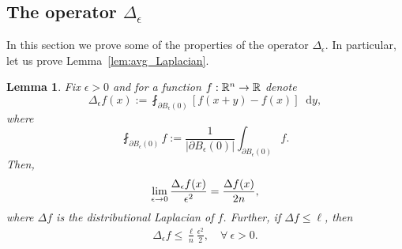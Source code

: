 \documentclass[10pt]{amsart}
\newtheorem{lemm}[theo]{Lemma}\newtheorem{prop}[theo]{Proposition}\newtheorem{coro}[theo]{Corollary}\newtheorem{conj}[theo]{Conjecture}
\theoremstyle{definition}\newtheorem{defi}[theo]{Definition}\newtheorem{rema}[theo]{Remark}\newtheorem{exam}[theo]{Example}\newtheorem{exem}[theo]{Example}\newtheorem{nota}[theo]{Notation}
\newcommand{\R}{\mathbb R}
\newcommand{\dd}{n}
\newcommand*\diff{\mathop{}\!\mathrm{d}}
\newcommand{\avgint}{\fint}
\renewcommand*{\to}{\mathchoice{\longrightarrow}{\rightarrow}{\rightarrow}{\rightarrow}}
\let\oldforall\forall
\renewcommand*{\forall}{\mathrel{\oldforall}}
\begin{document}
\subsection{The operator \texorpdfstring{$\Delta_{\epsilon}$}{Delta\_ epsilon}}\label{subsec:appendix_Delta_eps}
In this section we prove some of the properties of the operator $\Delta_{\epsilon}$. In particular, let us prove Lemma~\ref{lem:avg_Laplacian}.
\begin{lemm}\label{lem:avg_Laplacian_appendix}
Fix $\epsilon> 0$ and for a function $f:\R^{\dd}\to\R$ denote
\[
\Delta_{\epsilon}f(x):=\avgint_{\partial B_{\epsilon}(0)}[f(x+y)-f(x)]\diff y,
\]
where
\[
\avgint_{\partial B_{\epsilon}(0)}f:=\frac{1}{|\partial B_{\epsilon}(0)|}\int_{\partial B_{\epsilon}(0)}f.
\]
Then,
\begin{align}\label{eq:Delta_eps_lim_appendix}
\lim_{\epsilon\to 0}\frac{\Delta_{\epsilon}f(x)}{\epsilon^{2}}=\frac{\Delta f(x)}{2\dd},
\end{align}
where $\Delta f$ is the distributional Laplacian of $f$. Further, if $\Delta f\le \ell$, then
\begin{align}\label{eq:Delta_eps_bound_appendix}
\Delta_{\epsilon}f\le \frac{\ell}{\dd}\frac{\epsilon^2}{2},\quad \forall~\epsilon>0.
\end{align}
\end{lemm}
\end{document}
